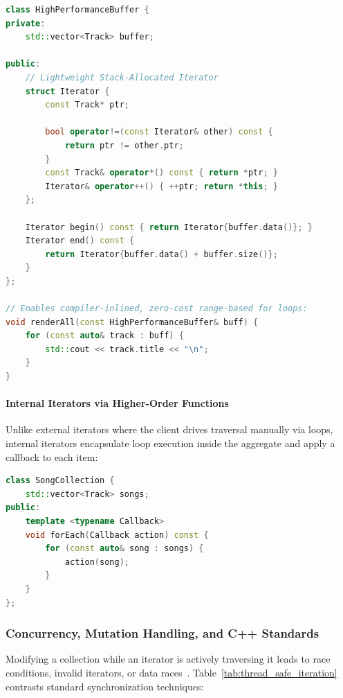\begin{lstlisting}[language=C++, caption={Zero-Cost Stack-Allocated Iterator in C++}]
class HighPerformanceBuffer {
private:
    std::vector<Track> buffer;

public:
    // Lightweight Stack-Allocated Iterator
    struct Iterator {
        const Track* ptr;

        bool operator!=(const Iterator& other) const { 
            return ptr != other.ptr; 
        }
        const Track& operator*() const { return *ptr; }
        Iterator& operator++() { ++ptr; return *this; }
    };

    Iterator begin() const { return Iterator{buffer.data()}; }
    Iterator end() const { 
        return Iterator{buffer.data() + buffer.size()}; 
    }
};

// Enables compiler-inlined, zero-cost range-based for loops:
void renderAll(const HighPerformanceBuffer& buff) {
    for (const auto& track : buff) {
        std::cout << track.title << "\n";
    }
}
\end{lstlisting}

\paragraph{Internal Iterators via Higher-Order Functions}
Unlike external iterators where the client drives traversal manually via loops, internal iterators encapsulate loop execution inside the aggregate and apply a callback to each item:

\begin{lstlisting}[language=C++, caption={Internal Iterator via Functional Callback}]
class SongCollection {
    std::vector<Track> songs;
public:
    template <typename Callback>
    void forEach(Callback action) const {
        for (const auto& song : songs) {
            action(song);
        }
    }
};
\end{lstlisting}

\subsubsection{Concurrency, Mutation Handling, and C++ Standards}
Modifying a collection while an iterator is actively traversing it leads to race conditions, invalid iterators, or data races~\cite{williams2019}. Table~\ref{tab:thread_safe_iteration} contrasts standard synchronization techniques:

